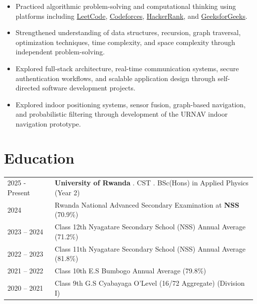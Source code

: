 \documentclass[a4paper,12pt]{article}
\begin{document}
\begin{itemize}[leftmargin=1em]

\item Practiced algorithmic problem-solving and computational thinking using platforms including \href{https://leetcode.com/u/gilbert-tuyambaze/}{LeetCode}, \href{https://codeforces.com/profile/tuyambaze-gilbert}{Codeforces}, \href{https://www.hackerrank.com/profile/gilbert_tuyamba1}{HackerRank}, and \href{https://www.geeksforgeeks.org/profile/user_utisj1nkell}{GeeksforGeeks}.

\item Strengthened understanding of data structures, recursion, graph traversal, optimization techniques, time complexity, and space complexity through independent problem-solving.

\item Explored full-stack architecture, real-time communication systems, secure authentication workflows, and scalable application design through self-directed software development projects.

\item Explored indoor positioning systems, sensor fusion, graph-based navigation, and probabilistic filtering through development of the URNAV indoor navigation prototype.

\end{itemize}


\section{Education}

\begin{tabularx}{\linewidth}{@{}l X@{}}
2025 - Present & \textbf{University of Rwanda} . CST .
BSc(Hons) in Applied Physics \hfill (Year 2)  \\

2024 & Rwanda National Advanced Secondary Examination at \textbf{NSS} \hfill (70.9\%) \\

2023 -- 2024 & Class 12th Nyagatare Secondary School (NSS) \hfill Annual Average (71.2\%) \\

2022 -- 2023 & Class 11th Nyagatare Secondary School (NSS) \hfill Annual Average (81.8\%) \\

2021 -- 2022 & Class 10th E.S Bumbogo \hfill Annual Average (79.8\%) \\

2020 -- 2021 & Class 9th G.S Cyabayaga \hfill O'Level (16/72 Aggregate) (Division I) \\

\end{tabularx}
\end{document}
